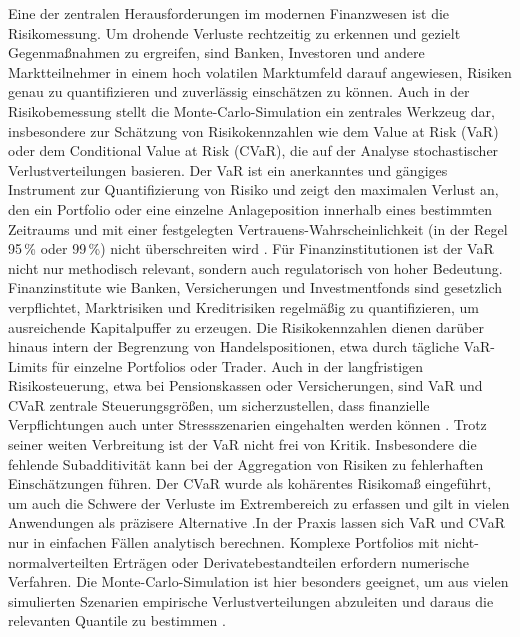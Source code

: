 Eine der zentralen Herausforderungen im modernen Finanzwesen ist die Risikomessung. Um drohende Verluste rechtzeitig zu erkennen und gezielt Gegenmaßnahmen zu ergreifen, sind Banken, Investoren und andere Marktteilnehmer in einem hoch volatilen Marktumfeld darauf angewiesen, Risiken genau zu quantifizieren und zuverlässig einschätzen zu können. 
Auch in der Risikobemessung stellt die Monte-Carlo-Simulation ein zentrales Werkzeug dar, insbesondere zur Schätzung von Risikokennzahlen wie dem Value at Risk (VaR) oder dem Conditional Value at Risk (CVaR), die auf der Analyse stochastischer Verlustverteilungen basieren. Der VaR ist ein anerkanntes und gängiges Instrument zur Quantifizierung von Risiko und zeigt den maximalen Verlust an, den ein Portfolio oder eine einzelne Anlageposition innerhalb eines bestimmten Zeitraums und mit einer festgelegten Vertrauens-Wahrscheinlichkeit (in der Regel 95\,\% oder 99\,\%) nicht überschreiten wird \cite{springer2025, plos2024}. 
Für Finanzinstitutionen ist der VaR nicht nur methodisch relevant, sondern auch regulatorisch von hoher Bedeutung. Finanzinstitute wie Banken, Versicherungen und Investmentfonds sind gesetzlich verpflichtet, Marktrisiken und Kreditrisiken regelmäßig zu quantifizieren, um ausreichende Kapitalpuffer zu erzeugen. Die Risikokennzahlen dienen darüber hinaus intern der Begrenzung von Handelspositionen, etwa durch tägliche VaR-Limits für einzelne Portfolios oder Trader. Auch in der langfristigen Risikosteuerung, etwa bei Pensionskassen oder Versicherungen, sind VaR und CVaR zentrale Steuerungsgrößen, um sicherzustellen, dass finanzielle Verpflichtungen auch unter Stressszenarien eingehalten werden können \cite{Orús et al., 2019}.
Trotz seiner weiten Verbreitung ist der VaR nicht frei von Kritik. Insbesondere die fehlende Subadditivität kann bei der Aggregation von Risiken zu fehlerhaften Einschätzungen führen. Der CVaR wurde als kohärentes Risikomaß eingeführt, um auch die Schwere der Verluste im Extrembereich zu erfassen und gilt in vielen Anwendungen als präzisere Alternative \cite{orus_quantum_2019}.In der Praxis lassen sich VaR und CVaR nur in einfachen Fällen analytisch berechnen. Komplexe Portfolios mit nicht-normalverteilten Erträgen oder Derivatebestandteilen erfordern numerische Verfahren. Die Monte-Carlo-Simulation ist hier besonders geeignet, um aus vielen simulierten Szenarien empirische Verlustverteilungen abzuleiten und daraus die relevanten Quantile zu bestimmen \cite{Zoufal et al., 2019}.

